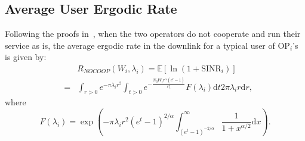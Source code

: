\documentclass[conference]{IEEEtran}
\begin{document}
\subsection{Average User Ergodic Rate}

Following the proofs in~\cite{Jeffrey@TCOM10}, when the two operators do not cooperate and run their service as is, the average ergodic rate in the downlink for a typical user of OP$_i$'s is given by:
\begin{eqnarray} \label{eqn:2}
&& R_{NOCOOP}(W_i, \lambda_i) = \mathbb{E}[\ln (1 + \textrm{SINR}_i)]  \nonumber \\
&=& \int_{r>0}e^{-\pi \lambda_i r^2} \int_{t>0}e^{-\frac{N_0 W_i r^\alpha (e^t - 1)}{P_t}} F(\lambda_i) \mbox{d}t 2\pi \lambda_i r \mbox{d}r,
\end{eqnarray}
where
\begin{equation} \label{eqn:3}
F(\lambda_i) = \exp(-\pi \lambda_i r^2(e^t - 1)^{2/\alpha} \int_{(e^t - 1)^{-2/\alpha}}^{\infty} \frac{1}{1 + x^{\alpha / 2}} \mbox{d}x).
\end{equation}
\end{document}
